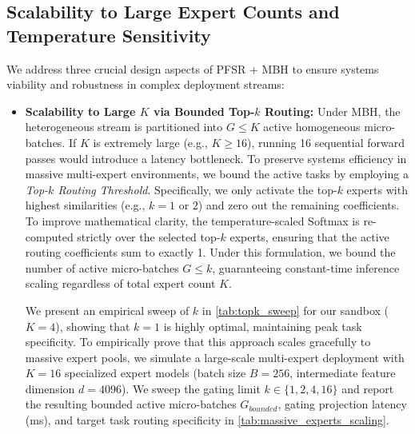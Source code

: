 \subsection{Scalability to Large Expert Counts and Temperature Sensitivity}
We address three crucial design aspects of PFSR + MBH to ensure systems viability and robustness in complex deployment streams:
\begin{itemize}
    \item \textbf{Scalability to Large $K$ via Bounded Top-$k$ Routing:} Under MBH, the heterogeneous stream is partitioned into $G \le K$ active homogeneous micro-batches. If $K$ is extremely large (e.g., $K \ge 16$), running 16 sequential forward passes would introduce a latency bottleneck. To preserve systems efficiency in massive multi-expert environments, we bound the active tasks by employing a \emph{Top-$k$ Routing Threshold}. Specifically, we only activate the top-$k$ experts with highest similarities (e.g., $k=1$ or $2$) and zero out the remaining coefficients. To improve mathematical clarity, the temperature-scaled Softmax is re-computed strictly over the selected top-$k$ experts, ensuring that the active routing coefficients sum to exactly 1. Under this formulation, we bound the number of active micro-batches $G \le k$, guaranteeing constant-time inference scaling regardless of total expert count $K$. 

    We present an empirical sweep of $k$ in \cref{tab:topk_sweep} for our sandbox ($K=4$), showing that $k=1$ is highly optimal, maintaining peak task specificity. To empirically prove that this approach scales gracefully to massive expert pools, we simulate a large-scale multi-expert deployment with $K=16$ specialized expert models (batch size $B=256$, intermediate feature dimension $d=4096$). We sweep the gating limit $k \in \{1, 2, 4, 16\}$ and report the resulting bounded active micro-batches $G_{bounded}$, gating projection latency (ms), and target task routing specificity in \cref{tab:massive_experts_scaling}.


\end{itemize}
